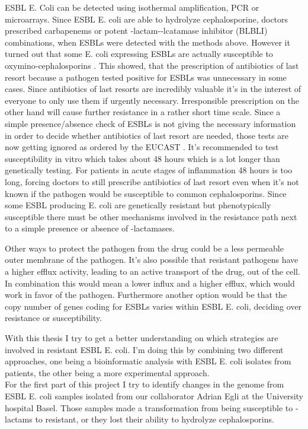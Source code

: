ESBL E. Coli can be detected using isothermal amplification, PCR or microarrays. Since ESBL E. coli are able to hydrolyze cephalosporine, doctors prescribed carbapenems or potent \textbeta-lactam-\textbeta-lcatamase inhibitor (BLBLI) combinations, when ESBLs were detected with the methods above. However it turned out that some E. coli expressing ESBLs are actually susceptible to oxymino-cephalosporins \cite{esbl_introduction}. This showed, that the prescription of antibiotics of last resort because a pathogen tested positive for ESBLs was unnecessary in some cases. Since antibiotics of last resorts are incredibly valuable it's in the interest of everyone to only use them if urgently necessary. Irresponsible prescription on the other hand will cause further resistance in a rather short time scale. 
Since a simple presence/absence check of ESBLs is not giving the necessary information in order to decide whether antibiotics of last resort are needed, those tests are now getting ignored as ordered by the EUCAST \cite{eucast}. It's recommended to test susceptibility in vitro which takes about 48 hours which is a lot longer than genetically testing. For patients in acute stages of inflammation 48 hours is too long, forcing doctors to still prescribe antibiotics of last resort even when it's not known if the pathogen would be susceptible to common cephalosporins. 
Since some ESBL producing E. coli are genetically resistant but phenotypically susceptible there must be other mechanisms involved in the resistance path next to a simple presence or absence of \textbeta-lactamases. 

Other ways to protect the pathogen from the drug could be a less permeable outer membrane of the pathogen. It's also possible that resistant pathogens have a higher efflux activity, leading to an active transport of the drug, out of the cell. In combination this would mean a lower influx and a higher efflux, which would work in favor of the pathogen. Furthermore another option would be that the copy number of genes coding for ESBLs varies within ESBL E. coli, deciding over resistance or susceptibility. 

With this thesis I try to get a better understanding on which strategies are involved in resistant ESBL E. coli. I'm doing this by combining two different approaches, one being a bioinformatic analysis with ESBL E. coli isolates from patients, the other being a more experimental approach.\\ 


For the first part of this project I try to identify changes in the genome from ESBL E. coli samples isolated from our collaborator Adrian Egli at the University hospital Basel. Those samples made a transformation from being susceptible to \textbeta-lactams to resistant, or they lost their ability to hydrolyze cephalosporins. 

